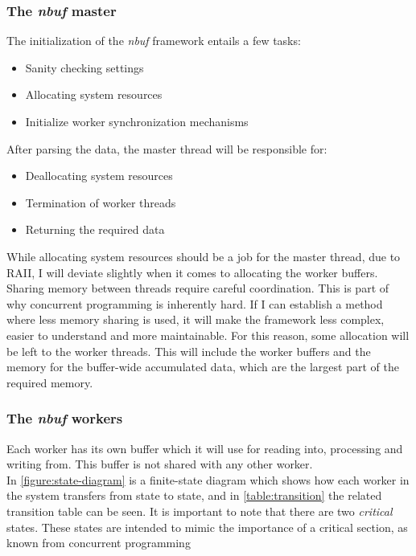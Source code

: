 \documentclass[a4paper]{article}
\newcommand{\nbuf}{\textit{nbuf} }
\begin{document}
\subsubsection{The \nbuf master}
The initialization of the \nbuf framework entails a few tasks:

\begin{itemize}
\item Sanity checking settings
\item Allocating system resources
\item Initialize worker synchronization mechanisms
\end{itemize} 

After parsing the data, the master thread will be responsible for:

\begin{itemize}
\item Deallocating system resources
\item Termination of worker threads
\item Returning the required data
\end{itemize} 

While allocating system resources should be a job for the master thread, due to RAII, I will deviate slightly when it comes to allocating the worker buffers. Sharing memory between threads require careful coordination. This is part of why concurrent programming is inherently hard. If I can establish a method where less memory sharing is used, it will make the framework less complex, easier to understand and more maintainable. For this reason, some allocation will be left to the worker threads. This will include the worker buffers and the memory for the buffer-wide accumulated data, which are the largest part of the required memory.



\subsubsection{The \nbuf workers}

Each worker has its own buffer which it will use for reading into, processing and writing from. This buffer is not shared with any other worker.\\

In \autoref{figure:state-diagram} is a finite-state diagram which shows how each worker in the system transfers from state to state, and in \autoref{table:transition} the related transition table can be seen. It is important to note that there are two \textit{critical} states. These states are intended to mimic the importance of a critical section, as known from concurrent programming\\\\
\end{document}
